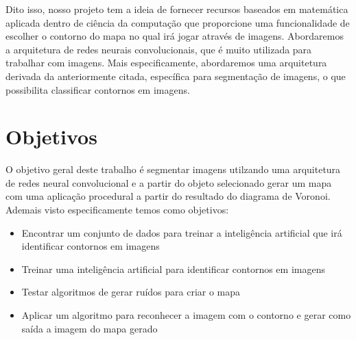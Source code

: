 Dito isso, nosso projeto tem a ideia de fornecer recursos baseados em matemática aplicada dentro de ciência da computação que proporcione uma funcionalidade  de escolher o contorno do mapa no qual irá jogar através de imagens. Abordaremos a arquitetura de redes neurais convolucionais, que é muito utilizada para trabalhar com imagens. Mais especificamente, abordaremos uma arquitetura derivada da anteriormente citada, específica para segmentação de imagens, o que possibilita classificar contornos em imagens.

\section{Objetivos}

O objetivo geral deste trabalho é segmentar imagens utilzando uma arquitetura de redes neural convolucional e a partir do objeto selecionado gerar um mapa com uma aplicação procedural a partir do resultado do diagrama de Voronoi.
Ademais visto especificamente temos como objetivos:

\begin{itemize}
	\item Encontrar um conjunto de dados para treinar a inteligência artificial que irá identificar contornos em imagens
	\item Treinar uma inteligência artificial para identificar contornos em imagens
	\item Testar algoritmos de gerar ruídos para criar o mapa
	\item Aplicar um algoritmo para reconhecer a imagem com o contorno e gerar como saída a imagem do mapa gerado
\end{itemize}

